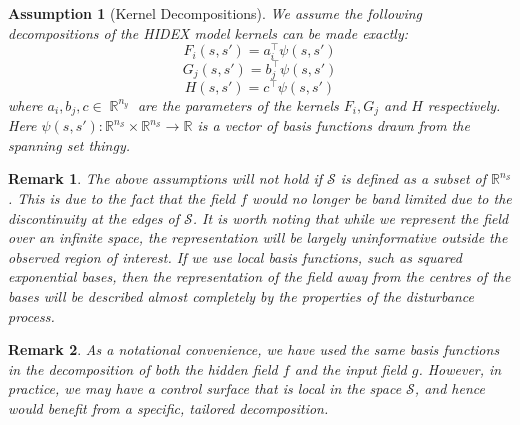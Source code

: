 \documentclass{IEEEtran}
\DeclareMathOperator{\R}{\mathbb{R}}
\DeclareMathOperator{\onto}{\rightarrow}
\newtheorem{remark}{Remark}
\newtheorem{assumption}{Assumption}
\begin{document}
\begin{assumption}[Kernel Decompositions]
	\label{ass:kerndecomp}
	We assume the following decompositions of the HIDEX model kernels can be made exactly:
	\begin{equation}
	F_i(s,s') = a_i^\top\psi(s,s')
\end{equation}
\begin{equation}
	G_j(s,s') = b_j^\top\psi(s,s')
\end{equation}
\begin{equation}
	H(s,s') = c^\top\psi(s,s')
\end{equation}
where $a_i, b_j, c \in \R^{n_y}$ are the parameters of the kernels $F_i, G_j$ and $H$ respectively. Here $\psi(s,s') : \mathbb{R}^{n_\mathcal{S}} \times \mathbb{R}^{n_\mathcal{S}} \onto \mathbb{R}$ is a vector of basis functions drawn from the spanning set thingy.
\end{assumption}



\begin{remark}
	The above assumptions will not hold if $\mathcal{S}$ is defined as a subset of $\mathbb{R}^{n_\mathcal{S}}$. This is due to the fact that the field $f$ would no longer be band limited due to the discontinuity at the edges of $\mathcal{S}$. It is worth noting that while we represent the field over an infinite space, the representation will be largely uninformative outside the observed region of interest. If we use local basis functions, such as squared exponential bases, then the representation of the field away from the centres of the bases will be described almost completely by the properties of the disturbance process.
\end{remark}

\begin{remark}
As a notational convenience, we have used the same basis functions in the decomposition of both the hidden field $f$ and the input field $g$. However, in practice, we may have a control surface that is local in the space $\mathcal{S}$, and hence would benefit from a specific, tailored decomposition. 
\end{remark}
\end{document}
